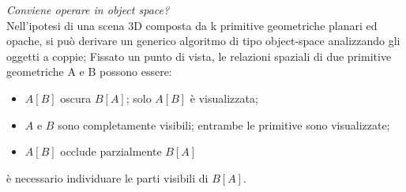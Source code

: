 \documentclass[a4paper, 10pt]{article}
\begin{document}
	
	\textit{Conviene operare in object space?}\\
	Nell’ipotesi di una scena 3D composta da k primitive geometriche planari ed opache, si può derivare un generico algoritmo di tipo object-space analizzando gli oggetti a coppie;
	Fissato un punto di vista, le relazioni spaziali di due primitive geometriche A e B possono essere:
	\begin{itemize}
		\item $ A [B] $ oscura $ B [A] $; solo $ A [B] $ è visualizzata;
		\item $ A $ e $ B $ sono completamente visibili; entrambe le primitive sono
		visualizzate;
		\item $ A [B] $ occlude parzialmente $ B [A] $
	\end{itemize}
	è necessario individuare le parti visibili di $ B [A] $.
\end{document}
